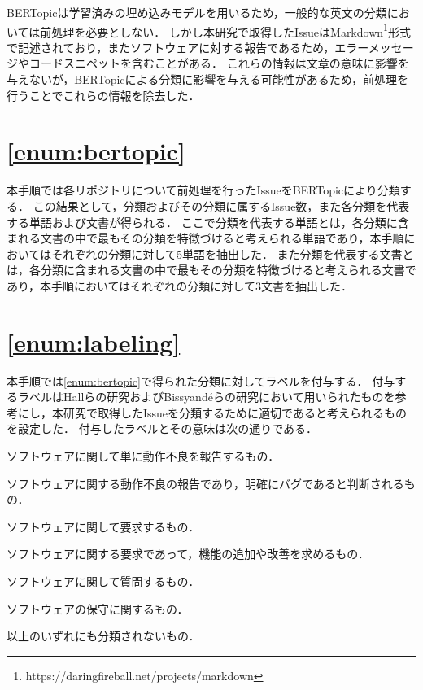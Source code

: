 \documentclass[main]{subfiles}
\begin{document}
BERTopicは学習済みの埋め込みモデルを用いるため，一般的な英文の分類においては前処理を必要としない．
しかし本研究で取得したIssueはMarkdown\footnote{https://daringfireball.net/projects/markdown}形式で記述されており，またソフトウェアに対する報告であるため，エラーメッセージやコードスニペットを含むことがある．
これらの情報は文章の意味に影響を与えないが，BERTopicによる分類に影響を与える可能性があるため，前処理を行うことでこれらの情報を除去した．


\section{\ref{enum:bertopic}}
\label{sec:bertopic}

本手順では各リポジトリについて前処理を行ったIssueをBERTopicにより分類する．
この結果として，分類およびその分類に属するIssue数，また各分類を代表する単語および文書が得られる．
ここで分類を代表する単語とは，各分類に含まれる文書の中で最もその分類を特徴づけると考えられる単語であり，本手順においてはそれぞれの分類に対して5単語を抽出した．
また分類を代表する文書とは，各分類に含まれる文書の中で最もその分類を特徴づけると考えられる文書であり，本手順においてはそれぞれの分類に対して3文書を抽出した．


\section{\ref{enum:labeling}}
\label{sec:labeling}

本手順では\ref{enum:bertopic}で得られた分類に対してラベルを付与する．
付与するラベルはHallらの研究およびBissyand{\'e}らの研究\cite{bissyande:2013}において用いられたものを参考にし，本研究で取得したIssueを分類するために適切であると考えられるものを設定した．
付与したラベルとその意味は次の通りである．

\begin{description}[labelwidth=6em, leftmargin=6em]
	\item[error] ソフトウェアに関して単に動作不良を報告するもの．
	\item[bug] ソフトウェアに関する動作不良の報告であり，明確にバグであると判断されるもの．
	\item[requirement] ソフトウェアに関して要求するもの．
	\item[improvement] ソフトウェアに関する要求であって，機能の追加や改善を求めるもの．
	\item[question] ソフトウェアに関して質問するもの．
	\item[maintenance] ソフトウェアの保守に関するもの．
	\item[other] 以上のいずれにも分類されないもの．
\end{description}
\end{document}
